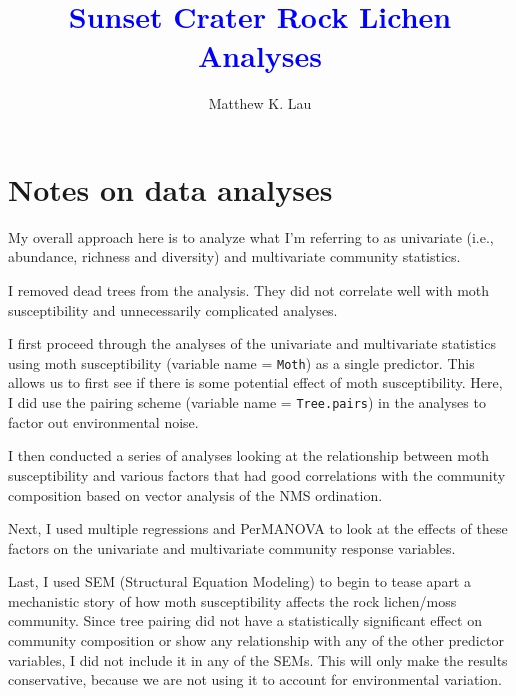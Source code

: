 \documentclass[a4paper]{article}
\title{\textcolor{blue}{Sunset Crater Rock Lichen Analyses}}
\author{Matthew K. Lau}
\begin{document}
\maketitle

\setcounter{tocdepth}{2}
\tableofcontents

\section{Notes on data analyses}
\begin{description}
\item My overall approach here is to analyze what I'm referring to as univariate (i.e., abundance, richness and diversity) and multivariate community statistics.
\item[*] I removed dead trees from the analysis. They did not correlate well with moth susceptibility and unnecessarily complicated analyses.
\item I first proceed through the analyses of the univariate and multivariate statistics using moth susceptibility (variable name = \texttt{Moth}) as a single predictor. This allows us to first see if there is some potential effect of moth susceptibility. Here, I did use the pairing scheme (variable name = \texttt{Tree.pairs}) in the analyses to factor out environmental noise.
\item I then conducted a series of analyses looking at the relationship between moth susceptibility and various factors that had good correlations with the community composition based on vector analysis of the NMS ordination.
\item Next, I used multiple regressions and PerMANOVA to look at the effects of these factors on the univariate and multivariate community response variables.
\item Last, I used SEM (Structural Equation Modeling) to begin to tease apart a mechanistic story of how moth susceptibility affects the rock lichen/moss community. Since tree pairing did not have a statistically significant effect on community composition or show any relationship with any of the other predictor variables, I did not include it in any of the SEMs. This will only make the results conservative, because we are not using it to account for environmental variation.
\end{description}

\end{document}
